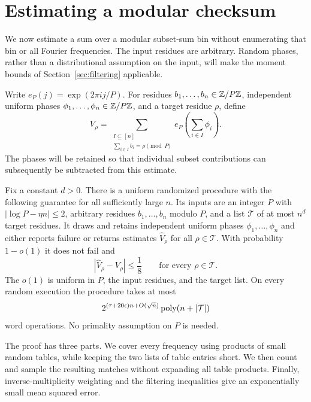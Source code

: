 \section{Estimating a modular checksum}
\label{sec:checksum}

We now estimate a sum over a modular subset-sum bin without enumerating
that bin or all Fourier frequencies.  The input residues are arbitrary.
Random phases, rather than a distributional assumption on the input,
will make the moment bounds of Section~\ref{sec:filtering} applicable.

Write $e_P(j)=\exp(2\pi i j/P)$.  For residues
$b_1,\ldots,b_n\in\mathbb Z/P\mathbb Z$, independent uniform phases
$\phi_1,\ldots,\phi_n\in\mathbb Z/P\mathbb Z$, and a target residue $\rho$, define
\begin{equation}
 V_\rho=
 \sum_{\substack{I\subseteq[n]\\\sum_{i\in I}b_i=\rho\pmod P}}
 e_P\!\left(\sum_{i\in I}\phi_i\right).
 \label{eq:checksum-definition}
\end{equation}
The phases will be retained so that individual subset contributions can
subsequently be subtracted from this estimate.

\begin{theorem}
\label{thm:checksum}
Fix a constant $d>0$.  There is a uniform randomized procedure with the
following guarantee for all sufficiently large $n$.  Its inputs are an
integer $P$ with $|\log P-\eta n|\le2$, arbitrary residues
$b_1,\ldots,b_n$ modulo $P$, and a list $\mathcal T$ of at most $n^d$
target residues.  It draws and retains independent uniform phases
$\phi_1,\ldots,\phi_n$ and either reports failure or returns estimates
$\widehat V_\rho$ for all $\rho\in\mathcal T$.  With probability
$1-o(1)$ it does not fail and
\[
 |\widehat V_\rho-V_\rho|\le\frac18
 \qquad\text{for every }\rho\in\mathcal T.
\]
The $o(1)$ is uniform in $P$, the input residues, and the target list.
On every random execution the procedure takes at most
\begin{equation}
 2^{(\tau+20\epsilon)n+O(\sqrt n)}\operatorname{poly}(n+|\mathcal T|)
 \label{eq:checksum-time}
\end{equation}
word operations.  No primality assumption on $P$ is needed.
\end{theorem}

The proof has three parts.  We cover every frequency using products of
small random tables, while keeping the two lists of table entries short.
We then count and sample the resulting matches without expanding all
table products.  Finally, inverse-multiplicity weighting and the
filtering inequalities give an exponentially small mean squared error.

